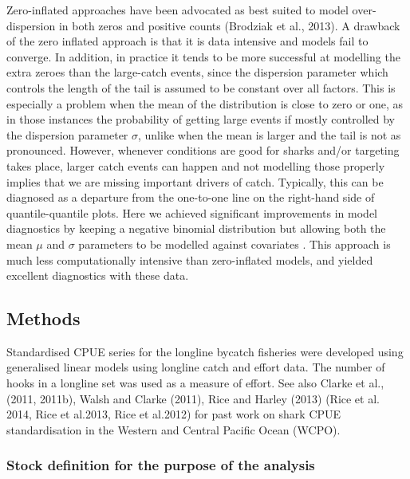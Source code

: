 Zero-inflated approaches have been advocated as best suited to model over-dispersion in both zeros and positive counts (Brodziak et al., 2013). A drawback of the zero inflated approach is that it is data intensive and models fail to converge. In addition, in practice it tends to be more successful at modelling the extra zeroes than the large-catch events, since the dispersion parameter which controls the length of the tail is assumed to be constant over all factors. This is especially a problem when the mean of the distribution is close to zero or one, as in those instances the probability of getting large events if mostly controlled by the dispersion parameter $\sigma$, unlike when the mean is larger and the tail is not as pronounced. However, whenever conditions are good for sharks and/or targeting takes place, larger catch events can happen and not modelling those properly implies that we are missing important drivers of catch. Typically, this can be diagnosed as a departure from the one-to-one line on the right-hand side of quantile-quantile plots. Here we achieved significant improvements in model diagnostics by keeping a negative binomial distribution but allowing both the mean $\mu$ and $\sigma$ parameters to be modelled against covariates \citep{Rigby2005_a}. This approach is much less computationally intensive than zero-inflated models, and yielded excellent diagnostics with these data.


 \subsection{Methods}
Standardised CPUE series for the longline bycatch fisheries were developed using generalised linear models using longline catch and effort data. The number of hooks in a longline set was used as a measure of effort.
See also Clarke et al., (2011, 2011b),  Walsh and Clarke (2011), Rice and Harley (2013) (Rice et al. 2014, Rice et al.2013, Rice et al.2012)  for past work on shark CPUE standardisation in the Western and Central Pacific Ocean (WCPO).
 \label{cpuemeth:datafilter}
 \subsubsection{Stock definition for the purpose of the analysis}
   
